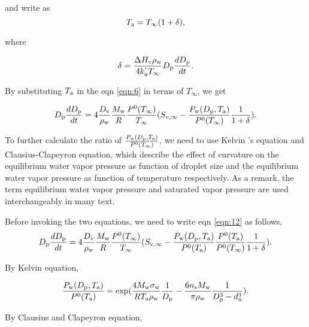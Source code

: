 \documentclass[12pt]{article}
\begin{document}
and write as 
\begin{equation}\label{eqn:10}
T_{\rm a}=T_{\infty}(1+\delta),
\end{equation}

where 

\begin{equation}\label{eqn:11}
\delta= \frac{\Delta H_{\rm v}  \rho_{\rm w}}{4 k^{'}_{\rm a}T_{\infty}} D_{\rm p} \frac{dD_{\rm p}}{dt}.
\end{equation}

By substituting $T_{\rm a}$ in the eqn \ref{eqn:6} in terms of $T_{\infty}$, we get 


\begin{equation}\label{eqn:12}
D_{\rm p}\frac{dD_{\rm p}}{dt}=4 \frac{D_{\rm v}} {\rho_{\rm w}} \frac{M_{\rm w}}{R} \frac{P^{\rm 0}(T_{\infty})} {T_{\infty}} (S_{v, \infty} - \frac{P_{\rm w}(D_{\rm p}, T_{\rm a})}{P^{\rm 0}(T_{\infty})} \frac{1}{1+\delta}).
\end{equation}

To further calculate the ratio of $\frac{P_{\rm w}(D_{\rm p}, T_{\rm a})}{P^{\rm 0}(T_{\infty})}$, we need to use Kelvin 's equation and Clausius-Clapeyron equation, which describe the effect of curvature on the equilibrium water vapor pressure as function of droplet size and the equilibrium water vapor pressure as function of temperature respectively. As a remark, the term equilibrium water vapor pressure and saturated vapor pressure are used interchangeably in many text.

Before invoking the two equations, we need to write eqn \ref{eqn:12} as follows,
\begin{equation}\label{eqn:SPgrowth}
D_{\rm p}\frac{dD_{\rm p}}{dt}=4 \frac{D_{\rm v}} {\rho_{\rm w}} \frac{M_{\rm w}}{R} \frac{P^{\rm 0}(T_{\infty})} {T_{\infty}} (S_{\rm v, \infty} - \frac{P_{\rm w}(D_{\rm p}, T_{\rm a})}{P^{\rm 0}(T_{\rm a})} \frac{P^{\rm 0}(T_{\rm a})}{P^{\rm 0}(T_{\infty})}\frac{1}{1+\delta}).
\end{equation}

By Kelvin equation, 

\begin{equation}\label{eqn:kelvin}
\frac{P_{\rm w}(D_{\rm p}, T_{\rm a})}{P^{\rm 0}(T_{\rm a})}=\exp( \frac{4 M_{\rm w}\sigma_{\rm w}}{R T_{\rm a} \rho_{\rm w}}\frac{1}{D_{\rm p}}-\frac{6 n_{\rm s} M_{\rm w}}{\pi \rho_{\rm w}} \frac{1}{D_{\rm p}^{3}-d_{\rm u}^{3}}).
\end{equation}

By Clausius and Clapeyron equation,
\end{document}
